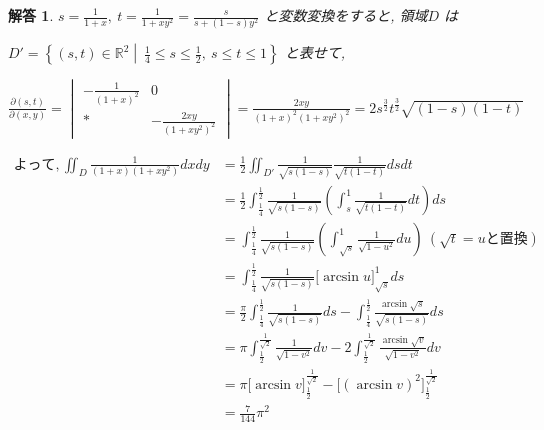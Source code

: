\documentclass{jsarticle}
\newtheorem{answer}{解答}
\begin{document}
\begin{answer}
$s = \displaystyle \frac{1}{1+x}, \ t = \displaystyle \frac{1}{1+xy^2} = \frac{s}{s + (1-s)y^2}$ と変数変換をすると, 領域$D$ は 

$D' = \left\{(s,t) \in \mathbb{R}^2 \middle| \ \displaystyle \frac{1}{4} \le s \le \frac{1}{2}, \ s \le t \le 1 \right\}$ と表せて, 

$\displaystyle \frac{\partial(s,t)}{\partial(x,y)} = \begin{vmatrix} -\frac{1}{(1+x)^2} & 0 \\ * & -\frac{2xy}{(1+xy^2)^2} \end{vmatrix} = \displaystyle \frac{2xy}{(1+x)^2 (1+xy^2)^2} = 2s^{\frac{3}{2}}t^{\frac{3}{2}} \sqrt{(1-s)(1-t)}$

\begin{align*}
よって, \displaystyle \iint_D \frac{1}{(1+x)(1+xy^2)} dx dy
&= \displaystyle \frac{1}{2} \iint_{D'} \frac{1}{\sqrt{s(1-s)}} \frac{1}{\sqrt{t(1-t)}} ds dt \\
&= \displaystyle \frac{1}{2} \int_{\frac{1}{4}}^{\frac{1}{2}}  \frac{1}{\sqrt{s(1-s)}} \left(\int_s^1 \frac{1}{\sqrt{t(1-t)}} dt \right) ds \\
&= \displaystyle \int_{\frac{1}{4}}^{\frac{1}{2}}  \frac{1}{\sqrt{s(1-s)}} \left( \int_{\sqrt{s}}^1 \frac{1}{\sqrt{1-u^2}} du \right) \ (\sqrt{t} = u と置換)\\
&= \displaystyle \int_{\frac{1}{4}}^{\frac{1}{2}} \frac{1}{\sqrt{s(1-s)}} \Big[\arcsin u \Big]_{\sqrt{s}}^1 ds\\
&= \displaystyle \frac{\pi}{2} \int_{\frac{1}{4}}^{\frac{1}{2}} \frac{1}{\sqrt{s(1-s)}} ds - \displaystyle \int_{\frac{1}{4}}^{\frac{1}{2}}  \frac{\arcsin{\sqrt{s}}}{\sqrt{s(1-s)}} ds \\
&= \pi \displaystyle \int_{\frac{1}{2}}^{\frac{1}{\sqrt{2}}} \frac{1}{\sqrt{1-v^2}} dv - 2\displaystyle \int_{\frac{1}{2}}^{\frac{1}{\sqrt{2}}}  \frac{\arcsin{\sqrt{v}}}{\sqrt{1-v^2}} dv \\
&= \pi \Big[\arcsin v \Big]_{\frac{1}{2}}^{\frac{1}{\sqrt{2}}} - \Big[(\arcsin v)^2 \Big]_{\frac{1}{2}}^{\frac{1}{\sqrt{2}}} \\
&= \displaystyle \frac{7}{144} {\pi}^2
\end{align*}
\end{answer}

\bigskip
\bigskip
\bigskip
\bigskip
\end{document}
